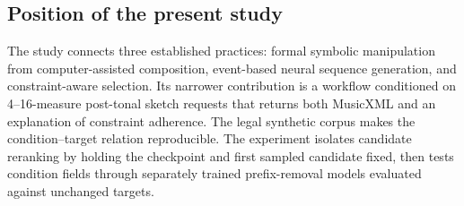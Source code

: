 \subsection{Position of the present study}

The study connects three established practices: formal symbolic manipulation from computer-assisted composition, event-based neural sequence generation, and constraint-aware selection. Its narrower contribution is a workflow conditioned on 4--16-measure post-tonal sketch requests that returns both MusicXML and an explanation of constraint adherence. The legal synthetic corpus makes the condition--target relation reproducible. The experiment isolates candidate reranking by holding the checkpoint and first sampled candidate fixed, then tests condition fields through separately trained prefix-removal models evaluated against unchanged targets.

